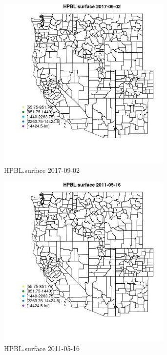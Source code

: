 \begin{figure} 
\centering  
\includegraphics[width=0.77\textwidth]{Code_Outputs/Report_ML_input_PM25_Step4_part_e_de_duplicated_aveswNAs_MapObsHPBLsurface2017-09-02.jpg} 
\caption{\label{fig:Report_ML_input_PM25_Step4_part_e_de_duplicated_aveswNAsMapObsHPBLsurface2017-09-02}HPBL.surface 2017-09-02} 
\end{figure} 
 

\begin{figure} 
\centering  
\includegraphics[width=0.77\textwidth]{Code_Outputs/Report_ML_input_PM25_Step4_part_e_de_duplicated_aveswNAs_MapObsHPBLsurface2011-05-16.jpg} 
\caption{\label{fig:Report_ML_input_PM25_Step4_part_e_de_duplicated_aveswNAsMapObsHPBLsurface2011-05-16}HPBL.surface 2011-05-16} 
\end{figure} 
 

